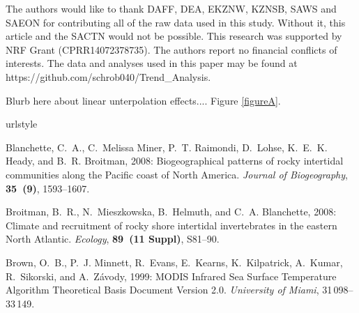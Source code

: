 \documentclass[]{ametsoc}
\begin{document}
\acknowledgments
The authors would like to thank DAFF, DEA, EKZNW, KZNSB, SAWS and SAEON for contributing all of the raw data used in this study. Without it, this article and the SACTN would not be possible. This research was supported by NRF Grant (CPRR14072378735). The authors report no financial conflicts of interests. The data and analyses used in this paper may be found at https://github.com/schrob040/Trend\_Analysis.

%

\appendix[A]
Blurb here about linear unterpolation effects.... Figure \ref{figureA}.

%
\begin{thebibliography}{23}
\providecommand{\natexlab}[1]{#1}
\providecommand{\url}[1]{\texttt{#1}}
\renewcommand{\UrlFont}{\rmfamily}
\providecommand{\urlprefix}{URL }
\expandafter\ifx\csname urlstyle\endcsname\relax
  \providecommand{\doi}[1]{doi:\discretionary{}{}{}#1}\else
  \providecommand{\doi}{doi:\discretionary{}{}{}\begingroup
  \urlstyle{rm}\Url}\fi
\providecommand{\eprint}[2][]{\url{#2}}

Blanchette, C.~A., C.~{Melissa Miner}, P.~T. Raimondi, D.~Lohse, K.~E.~K.
  Heady, and B.~R. Broitman, 2008: {Biogeographical patterns of rocky
  intertidal communities along the Pacific coast of North America}.
  \textit{Journal of Biogeography}, \textbf{35~(9)}, 1593--1607.

Broitman, B.~R., N.~Mieszkowska, B.~Helmuth, and C.~A. Blanchette, 2008:
  {Climate and recruitment of rocky shore intertidal invertebrates in the
  eastern North Atlantic.} \textit{Ecology}, \textbf{89~(11 Suppl)}, S81--90.

Brown, O.~B., P.~J. Minnett, R.~Evans, E.~Kearns, K.~Kilpatrick, A.~Kumar,
  R.~Sikorski, and A.~Z{\'{a}}vody, 1999: {MODIS Infrared Sea Surface
  Temperature Algorithm Theoretical Basis Document Version 2.0}.
  \textit{University of Miami}, 31\,098--33\,149.



\end{thebibliography}
\end{document}
